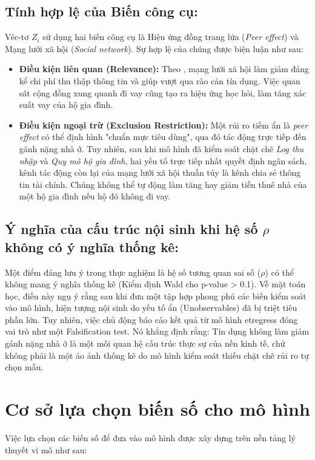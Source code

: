 \documentclass[12pt,a4paper]{report}
\begin{document}
\subsection{Tính hợp lệ của Biến công cụ:}
Véc-tơ $Z_i$ sử dụng hai biến công cụ là Hiệu ứng đồng trang lứa (\textit{Peer effect}) và Mạng lưới xã hội (\textit{Social network}). Sự hợp lệ của chúng được biện luận như sau:
\begin{itemize}
	\item \textbf{Điều kiện liên quan (Relevance):} Theo \textcite{Gine2014}, mạng lưới xã hội làm giảm đáng kể chi phí thu thập thông tin và giúp vượt qua rào cản tín dụng. Việc quan sát cộng đồng xung quanh đi vay cũng tạo ra hiệu ứng học hỏi, làm tăng xác suất vay của hộ gia đình. 
	\item \textbf{Điều kiện ngoại trừ (Exclusion Restriction):} Một rủi ro tiềm ẩn là \textit{peer effect} có thể định hình "chuẩn mực tiêu dùng", qua đó tác động trực tiếp đến gánh nặng nhà ở. Tuy nhiên, sau khi mô hình đã kiểm soát chặt chẽ \textit{Log thu nhập} và \textit{Quy mô hộ gia đình}, hai yếu tố trực tiếp nhất quyết định ngân sách, kênh tác động còn lại của mạng lưới xã hội thuần túy là kênh chia sẻ thông tin tài chính. Chúng không thể tự động làm tăng hay giảm tiền thuê nhà của một hộ gia đình nếu hộ đó không đi vay.
\end{itemize}

\subsection{Ý nghĩa của cấu trúc nội sinh khi hệ số $\rho$ không có ý nghĩa thống kê:}
Một điểm đáng lưu ý trong thực nghiệm là hệ số tương quan sai số ($\rho$) có thể không mang ý nghĩa thống kê (Kiểm định Wald cho p-value > 0.1). Về mặt toán học, điều này ngụ ý rằng sau khi đưa một tập hợp phong phú các biến kiểm soát vào mô hình, hiện tượng nội sinh do yếu tố ẩn (Unobservables) đã bị triệt tiêu phần lớn. Tuy nhiên, việc chủ động báo cáo kết quả từ mô hình etregress đóng vai trò như một Falsification test. Nó khẳng định rằng: Tín dụng không làm giảm gánh nặng nhà ở là một mối quan hệ cấu trúc thực sự của nền kinh tế, chứ không phải là một ảo ảnh thống kê do mô hình kiểm soát thiếu chặt chẽ rủi ro tự chọn mẫu.


\section{Cơ sở lựa chọn biến số cho mô hình}

Việc lựa chọn các biến số để đưa vào mô hình được xây dựng trên nền tảng lý thuyết vi mô như sau:
\end{document}
